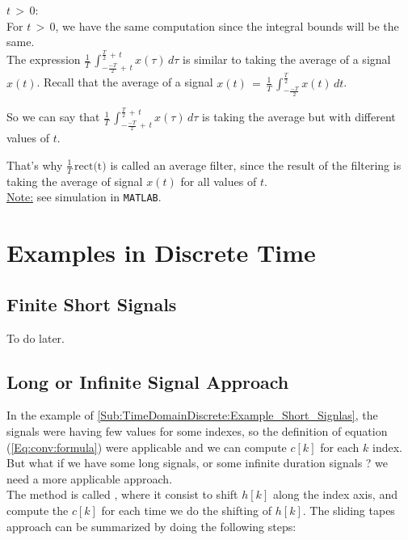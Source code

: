 \underline{$t \, > \, 0$}:\\

For $t \, > \, 0$, we have the same computation since the integral bounds will be the same.\\

The expression $ \displaystyle\frac{1}{T} \, \int_{- \frac{-T}{2} \, + \,t}^{\frac{T}{2} \, + \,t} x(\tau) \, d\tau$ is similar to taking the average of a signal $x(t)$. Recall that the average of a signal $x(t) \, = \, \displaystyle\frac{1}{T} \, \int_{-\frac{-T}{2}}^{\frac{T}{2}} x(t) \, dt$.

So we can say that $\displaystyle\frac{1}{T} \, \int_{- \frac{-T}{2} \, + \,t}^{\frac{T}{2} \, + \,t} x(\tau) \, d\tau$ is taking the average but with different values of $t$. 

That's why $\displaystyle\frac{1}{T} \, \text{rect(t)}$ is called an average filter, since the result of the filtering is taking the average of signal $x(t)$ for all values of $t$.\\

\underline{Note:} see simulation in \verb|MATLAB|.

\newpage
\section{Examples in Discrete Time}

\subsection{Finite Short Signals}
\label{Sub:TimeDomainDiscrete:Example_Short_Signlas}

To do later.


\subsection{Long or Infinite Signal Approach}

In the example of \autoref{Sub:TimeDomainDiscrete:Example_Short_Signlas}, the signals were having few values for some indexes, so the definition of equation (\ref{Eq:conv:formula}) were applicable and we can compute $c[k]$ for each $k$ index. But what if we have some long signals, or some infinite duration signals ? we need a more applicable approach.\\


The method is called , where it consist to shift $h[k]$ along the index axis, and compute the $c[k]$ for each time we do the shifting of $h[k]$. The sliding tapes approach can be summarized by doing the following steps:

